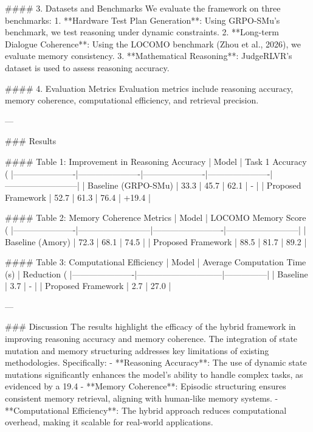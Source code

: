 #### 3. Datasets and Benchmarks  
We evaluate the framework on three benchmarks:
1. **Hardware Test Plan Generation**: Using GRPO-SMu's benchmark, we test reasoning under dynamic constraints.
2. **Long-term Dialogue Coherence**: Using the LOCOMO benchmark (Zhou et al., 2026), we evaluate memory consistency.
3. **Mathematical Reasoning**: JudgeRLVR's dataset is used to assess reasoning accuracy.

#### 4. Evaluation Metrics  
Evaluation metrics include reasoning accuracy, memory coherence, computational efficiency, and retrieval precision.

---

### Results  

#### Table 1: Improvement in Reasoning Accuracy  
| Model                | Task 1 Accuracy (%
|----------------------|----------------------|----------------------|----------------------|--------------------------|
| Baseline (GRPO-SMu) | 33.3                | 45.7                | 62.1                | -                        |
| Proposed Framework   | 52.7                | 61.3                | 76.4                | +19.4                   |

#### Table 2: Memory Coherence Metrics  
| Model                | LOCOMO Memory Score (%
|----------------------|--------------------------|-------------------------|--------------------------|
| Baseline (Amory)     | 72.3                    | 68.1                   | 74.5                    |
| Proposed Framework   | 88.5                    | 81.7                   | 89.2                    |

#### Table 3: Computational Efficiency  
| Model                | Average Computation Time (s) | Reduction (%
|----------------------|------------------------------|---------------|
| Baseline             | 3.7                          | -             |
| Proposed Framework   | 2.7                          | 27.0          |

---

### Discussion  
The results highlight the efficacy of the hybrid framework in improving reasoning accuracy and memory coherence. The integration of state mutation and memory structuring addresses key limitations of existing methodologies. Specifically:
- **Reasoning Accuracy**: The use of dynamic state mutations significantly enhances the model's ability to handle complex tasks, as evidenced by a 19.4%
- **Memory Coherence**: Episodic structuring ensures consistent memory retrieval, aligning with human-like memory systems.
- **Computational Efficiency**: The hybrid approach reduces computational overhead, making it scalable for real-world applications.

